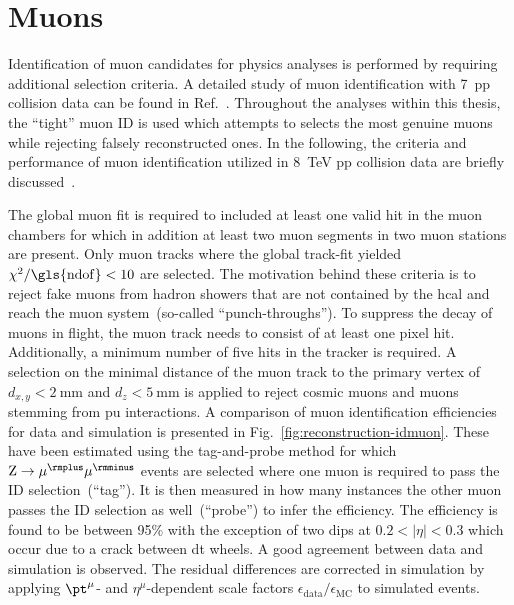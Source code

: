 \section{Muons}
\label{sec:reconstruction-muons}

Identification of muon candidates for physics analyses is performed by requiring additional selection criteria. A detailed study of muon identification with 7~\TeV pp collision data can be found in Ref.~\cite{Chatrchyan:2012xi}. Throughout the analyses within this thesis, the ``tight'' muon ID is used which attempts to selects the most genuine muons while rejecting falsely reconstructed ones. In the following, the criteria and performance of muon identification utilized in 8~TeV pp collision data are briefly discussed~\cite{CMS-DP-2013-009}.

The global muon fit is required to included at least one valid hit in the muon chambers for which in addition at least two muon segments in two muon stations are present. Only muon tracks where the global track-fit yielded $\chi^2/\mathrm{\gls{ndof}}<10$ are selected. The motivation behind these criteria is to reject fake muons from hadron showers that are not contained by the \gls{hcal} and reach the muon system~(so-called ``punch-throughs''). To suppress the decay of muons in flight, the muon track needs to consist of at least one pixel hit. Additionally, a minimum number of five hits in the tracker is required. A selection on the minimal distance of the muon track to the primary vertex of $d_{x,y}<2~\mathrm{mm}$ and $d_{z}<5~\mathrm{mm}$ is applied to reject cosmic muons and muons stemming from \gls{pu} interactions. A comparison of muon identification efficiencies for data and simulation is presented in Fig.~\ref{fig:reconstruction-idmuon}. These have been estimated using the tag-and-probe method for which $\mathrm{Z}\to\mu^{\rmplus}\mu^{\rmminus}$ events are selected where one muon is required to pass the ID selection~(``tag''). It is then measured in how many instances the other muon passes the ID selection as well~(``probe'') to infer the efficiency. The efficiency is found to be between 95\% with the exception of two dips at $0.2<|\eta|<0.3$ which occur due to a crack between \gls{dt} wheels. A good agreement between data and simulation is observed. The residual differences are corrected in simulation by applying $\pt^{\mu}$- and $\eta^{\mu}$-dependent scale factors $\epsilon_\mathrm{data}/\epsilon_\mathrm{MC}$ to simulated events.

